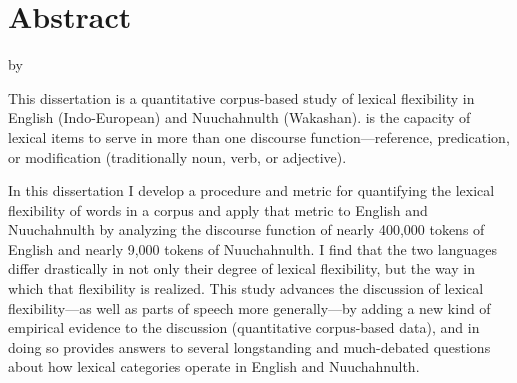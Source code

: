 \clearpage
{}
\section*{Abstract}
\label{sec:abstract}

\begin{center}

  \doctitle

  by

  \theauthor

\end{center}

This dissertation is a quantitative corpus-based study of lexical flexibility in English (Indo-European) and Nuuchahnulth (Wakashan).  is the capacity of lexical items to serve in more than one discourse function—reference, predication, or modification (traditionally noun, verb, or adjective).

In this dissertation I develop a procedure and metric for quantifying the lexical flexibility of words in a corpus and apply that metric to English and Nuuchahnulth by analyzing the discourse function of nearly 400,000 tokens of English and nearly 9,000 tokens of Nuuchahnulth. I find that the two languages differ drastically in not only their degree of lexical flexibility, but the way in which that flexibility is realized. This study advances the discussion of lexical flexibility---as well as parts of speech more generally---by adding a new kind of empirical evidence to the discussion (quantitative corpus-based data), and in doing so provides answers to several longstanding and much-debated questions about how lexical categories operate in English and Nuuchahnulth.
